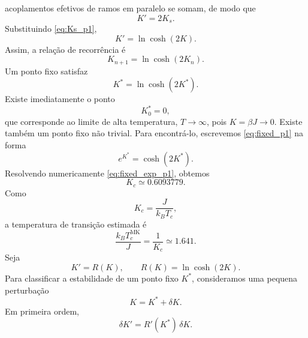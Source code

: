 \documentclass[12pt,a4paper]{article}
\begin{document}
acoplamentos efetivos de ramos em paralelo se somam, de modo que
%
\begin{equation}
    K'=2K_s.
    \label{eq:Kprime_parallel_p1}
\end{equation}
%
Substituindo \eqref{eq:Ks_p1},
%
\begin{equation}
    \boxed{
    K'
    =
    \ln\cosh(2K).
    }
    \label{eq:RG_Ising_diamond}
\end{equation}
%
Assim, a relação de recorrência é
%
\begin{equation}
    \boxed{
    K_{n+1}
    =
    \ln\cosh(2K_n).
    }
    \label{eq:recursion_p1}
\end{equation}
% 
Um ponto fixo satisfaz
%
\begin{equation}
    K^*=\ln\cosh(2K^*).
    \label{eq:fixed_p1}
\end{equation}
%
Existe imediatamente o ponto
%
\begin{equation}
    \boxed{K^*_0=0},
\end{equation}
%
que corresponde ao limite de alta temperatura, \(T\to\infty\), pois
\(K=\beta J\to0\). Existe também um ponto fixo não trivial. Para encontrá-lo,
escrevemos \eqref{eq:fixed_p1} na forma
%
\begin{equation}
    e^{K^*}=\cosh(2K^*).
    \label{eq:fixed_exp_p1}
\end{equation}
%
Resolvendo numericamente \eqref{eq:fixed_exp_p1}, obtemos
%
\begin{equation}
    \boxed{
    K_c\simeq0.6093779.
    }
    \label{eq:Kc_p1}
\end{equation}
%
Como
%
\begin{equation}
    K_c=\frac{J}{k_BT_c},
\end{equation}
%
a temperatura de transição estimada é
%
\begin{equation}
    \boxed{
    \frac{k_BT_c^{\mathrm{MK}}}{J}
    =
    \frac{1}{K_c}
    \simeq1.641.
    }
    \label{eq:Tc_p1}
\end{equation}
% 
Seja
%
\begin{equation}
    K'=R(K),
    \qquad
    R(K)=\ln\cosh(2K).
    \label{eq:RK_p1}
\end{equation}
%
Para classificar a estabilidade de um ponto fixo $K^*$, consideramos
uma pequena perturbação
%
\begin{equation}
    K=K^*+\delta K.
\end{equation}
%
Em primeira ordem,
%
\begin{equation}
    \delta K'
    =
    R'(K^*)\,\delta K.
\end{equation}
\end{document}
